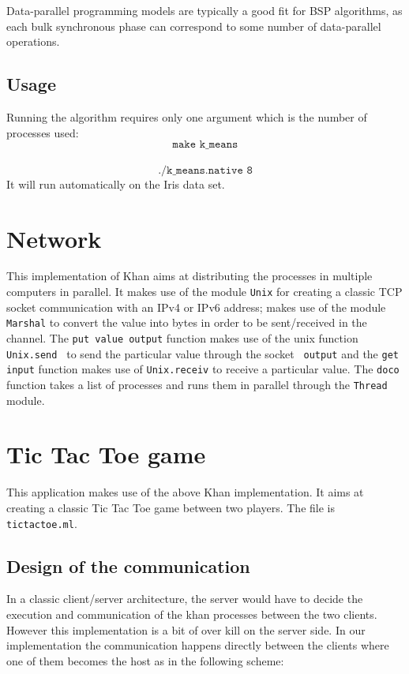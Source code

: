 \documentclass{article}
\begin{document}
Data-parallel programming models are typically a good fit for BSP algorithms, as each bulk synchronous phase can correspond to some number of data-parallel operations.


\subsection{Usage}

Running the algorithm requires only one argument which is the number of processes used: $$\texttt{make k\_means}$$ \\ $$\texttt{./k\_means.native 8}$$ 
It will run automatically on the Iris data set.

\section{Network}
This implementation of Khan aims at distributing the processes in multiple computers in parallel. It makes use of the module \texttt{Unix} for creating a classic TCP socket communication with an IPv4 or IPv6 address; makes use of the module \texttt{Marshal} to convert the value into bytes in order to be sent/received in the channel. The \texttt{put value output} function makes use of the unix function \texttt{Unix.send } to send the particular value through the socket \texttt{ output} and the \texttt{get input} function makes use of \texttt{Unix.receiv} to receive a particular value. The \texttt{doco} function takes a list of processes and runs them in parallel through the \texttt{Thread} module.

\section{Tic Tac Toe game}

This application makes use of the above Khan implementation. It aims at creating a classic Tic Tac Toe game between two players. The file is \texttt{tictactoe.ml}.

\subsection{Design of the communication }

In a classic client/server architecture, the server would have to decide the execution and communication of the khan processes between the two clients. However this implementation is a bit of over kill on the server side. In our implementation the communication happens directly between the clients where one of them becomes the host as in the following scheme:
\end{document}
